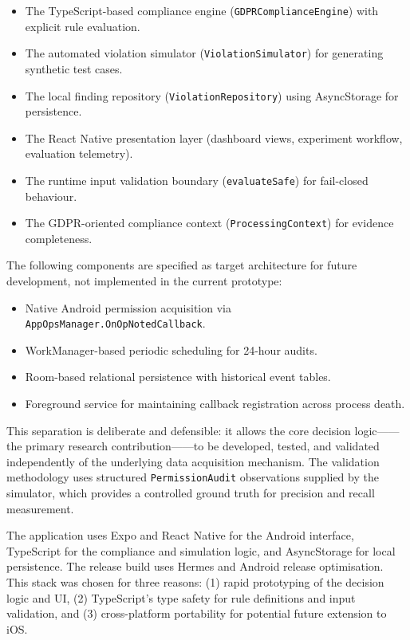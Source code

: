 \begin{itemize}
\item The TypeScript-based compliance engine (\texttt{GDPRComplianceEngine}) with explicit rule evaluation.
\item The automated violation simulator (\texttt{ViolationSimulator}) for generating synthetic test cases.
\item The local finding repository (\texttt{ViolationRepository}) using AsyncStorage for persistence.
\item The React Native presentation layer (dashboard views, experiment workflow, evaluation telemetry).
\item The runtime input validation boundary (\texttt{evaluateSafe}) for fail-closed behaviour.
\item The GDPR-oriented compliance context (\texttt{ProcessingContext}) for evidence completeness.
\end{itemize}

The following components are specified as target architecture for future development, not implemented in the current prototype:

\begin{itemize}
\item Native Android permission acquisition via \texttt{AppOpsManager.OnOpNotedCallback}.
\item WorkManager-based periodic scheduling for 24-hour audits.
\item Room-based relational persistence with historical event tables.
\item Foreground service for maintaining callback registration across process death.
\end{itemize}

This separation is deliberate and defensible: it allows the core decision logic——the primary research contribution——to be developed, tested, and validated independently of the underlying data acquisition mechanism. The validation methodology uses structured \texttt{PermissionAudit} observations supplied by the simulator, which provides a controlled ground truth for precision and recall measurement.

The application uses Expo and React Native for the Android interface, TypeScript for the compliance and simulation logic, and AsyncStorage for local persistence. The release build uses Hermes and Android release optimisation. This stack was chosen for three reasons: (1) rapid prototyping of the decision logic and UI, (2) TypeScript's type safety for rule definitions and input validation, and (3) cross-platform portability for potential future extension to iOS.

